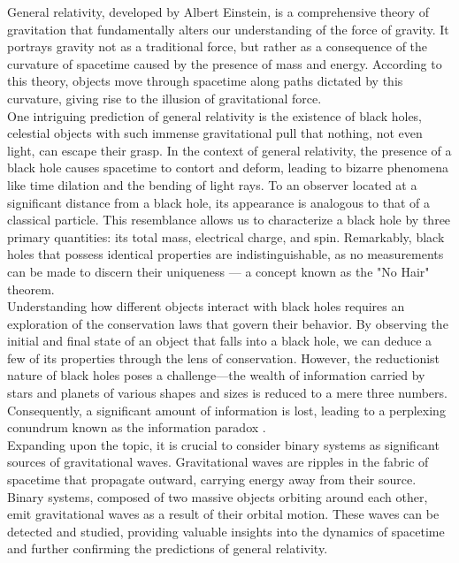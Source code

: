 General relativity, developed by Albert Einstein, is a comprehensive theory of gravitation that fundamentally alters our understanding of the force of gravity. It portrays gravity not as a traditional force, but rather as a consequence of the curvature of spacetime caused by the presence of mass and energy. According to this theory, objects move through spacetime along paths dictated by this curvature, giving rise to the illusion of gravitational force.
\\
One intriguing prediction of general relativity is the existence of black holes, celestial objects with such immense gravitational pull that nothing, not even light, can escape their grasp. In the context of general relativity, the presence of a black hole causes spacetime to contort and deform, leading to bizarre phenomena like time dilation and the bending of light rays. To an observer located at a significant distance from a black hole, its appearance is analogous to that of a classical particle. This resemblance allows us to characterize a black hole by three primary quantities: its total mass, electrical charge, and spin. Remarkably, black holes that possess identical properties are indistinguishable, as no measurements can be made to discern their uniqueness \cite{HawMalStr16} — a concept known as the "No Hair" theorem.
\\
Understanding how different objects interact with black holes requires an exploration of the conservation laws that govern their behavior. By observing the initial and final state of an object that falls into a black hole, we can deduce a few of its properties through the lens of conservation. However, the reductionist nature of black holes poses a challenge—the wealth of information carried by stars and planets of various shapes and sizes is reduced to a mere three numbers. Consequently, a significant amount of information is lost, leading to a perplexing conundrum known as the information paradox \cite{HawMalStr16}.
\\
Expanding upon the topic, it is crucial to consider binary systems as significant sources of gravitational waves. Gravitational waves are ripples in the fabric of spacetime that propagate outward, carrying energy away from their source. Binary systems, composed of two massive objects orbiting around each other, emit gravitational waves as a result of their orbital motion. These waves can be detected and studied, providing valuable insights into the dynamics of spacetime and further confirming the predictions of general relativity.
\\
